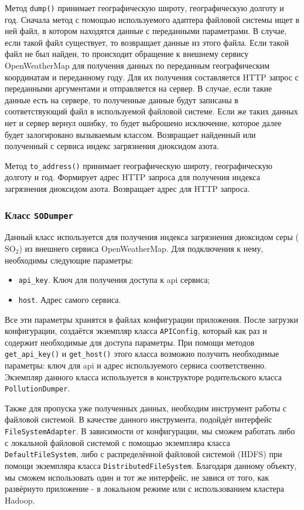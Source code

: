 Метод \texttt{dump()} принимает географическую широту, географическую долготу и год.
Сначала метод с помощью используемого адаптера файловой системы ищет в ней файл, в котором находятся данные с переданными параметрами.
В случае, если такой файл существует, то возвращает данные из этого файла.
Если такой файл не был найден, то происходит обращение к внешнему сервису OpenWeatherMap для получения данных по переданным географическим координатам и переданному году.
Для их получения составляется HTTP запрос с переданными аргументами и отправляется на сервер.
В случае, если такие данные есть на сервере, то полученные данные будут записаны в соответствующий файл в используемой файловой системе.
Если же таких данных нет и сервер вернул ошибку, то будет выброшено исключение, которое далее будет залогировано вызываемым классом.
Возвращает найденный или полученный с сервиса индекс загрязнения диоксидом азота.

Метод \texttt{to\_address()} принимает географическую широту, географическую долготу и год.
Формирует адрес HTTP запроса для получения индекса загрязнения диоксидом азота.
Возвращает адрес для HTTP запроса.




\subsubsection{Класс \texttt{SODumper}}
Данный класс используется для получения индекса загрязнения диоксидом серы ($ \text{SO}_{\text{2}} $) из внешнего сервиса OpenWeatherMap.
Для подключения к нему, необходимы следующие параметры:

\begin{itemize}
\item \texttt{api\_key}. Ключ для получения доступа к api сервиса;
\item \texttt{host}. Адрес самого сервиса.
\end{itemize}

Все эти параметры хранятся в файлах конфигурации приложения.
После загрузки конфигурации, создаётся экземпляр класса \texttt{APIConfig}, который как раз и содержит необходимые для доступа параметры.
При помощи методов \texttt{get\_api\_key()} и \texttt{get\_host()} этого класса возможно получить необходимые параметры: ключ для api и адрес используемого сервиса соответственно.
Экземпляр данного класса используется в конструкторе родительского класса \texttt{PollutionDumper}.

Также для пропуска уже полученных данных, необходим инструмент работы с файловой системой.
В качестве данного инструмента, подойдёт интерфейс \texttt{FileSystemAdapter}.
В зависимости от конфигурации, мы сможем работать либо с локальной файловой системой с помощью экземпляра класса \texttt{DefaultFileSystem}, либо с распределённой файловой системой (HDFS) при помощи экземпляра класса \texttt{DistributedFileSystem}.
Благодаря данному объекту, мы сможем использовать один и тот же интерфейс, не завися от того, как развёрнуто приложение - в локальном режиме или с использованием кластера Hadoop.

